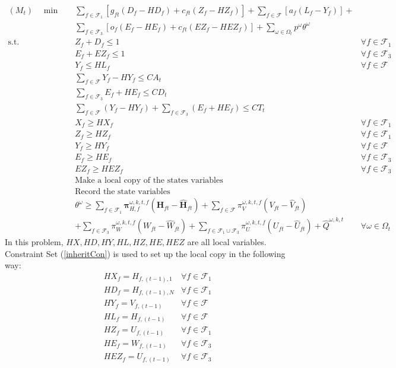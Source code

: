 \documentclass[12pt]{article}
\begin{document}
	\begin{align}
		(M_t)\quad \min \quad & \sum_{f \in \mathcal{F}_1} \left[ g_{ft} (D_f - HD_f) + c_{ft} (Z_f - HZ_f) \right] + \sum_{f \in \mathcal{F}} \left[ a_f (L_f - Y_f)\right] + & \nonumber \\
		& \sum_{f \in \mathcal{F}_3} \left[ o_f(E_f - HE_f) + c_{ft}(EZ_f - HEZ_f)\right] + \sum_{\omega \in \Omega_t} p^\omega \theta^\omega &\\
		\text{s.t.} \quad & Z_f + D_f \leq 1 & \forall f \in \mathcal{F}_1\\
		& E_f + EZ_f \leq 1 & \forall f \in \mathcal{F}_3\\
		& Y_f \leq HL_f & \forall f \in \mathcal{F}\\
		& \sum_{f \in \mathcal{F}} Y_f - HY_f \leq CA_t &\\
		& \sum_{f \in \mathcal{F}_3} E_f + HE_f \leq CD_t &\\
		& \sum_{f \in \mathcal{F}} (Y_f - HY_f) + \sum_{f \in \mathcal{F}_3} (E_f + HE_f) \leq CT_t &\\
		& X_f \geq HX_f & \forall f \in \mathcal{F}_1\\
		& Z_f \geq HZ_f & \forall f \in \mathcal{F}_1\\
		& Y_f \geq HY_f & \forall f \in \mathcal{F}\\
		& E_f \geq HE_f & \forall f \in \mathcal{F}_3\\
		& EZ_f \geq HEZ_f & \forall f \in \mathcal{F}_3\\
		& \text{Make a local copy of the states variables}& \label{inheritCon}\\
		& \text{Record the state variables}& \label{passDown}\\
		& \theta^\omega \geq \sum_{f \in \mathcal{F}_1} \mathbf{\pi}_{H,f}^{\omega,k,t,f} (\mathbf{H}_{ft} - \hat{\mathbf{H}}_{ft}) + \sum_{f \in \mathcal{F}}\pi_{V}^{\omega,k,t,f} (V_{ft} - \hat{V}_{ft}) & \nonumber\\
		& + \sum_{f \in \mathcal{F}_3} \pi_{W}^{\omega,k,t,f} (W_{ft} - \hat{W}_{ft}) + \sum_{f \in \mathcal{F}_1 \cup \mathcal{F}_3} \pi_{U}^{\omega,k,t,f} (U_{ft} - \hat{U}_{ft}) + \hat{Q}^{\omega,k,t} & \forall \omega \in \Omega_t
	\end{align}
	In this problem, \(HX,HD,HY,HL,HZ,HE,HEZ\) are all local variables. Constraint Set (\ref{inheritCon}) is used to set up the local copy in the following way:
	\begin{align*}
		& HX_f = H_{f,(t-1),1}& \forall f \in \mathcal{F}_1\\
		& HD_f = H_{f,(t-1),N}& \forall f \in \mathcal{F}_1\\
		& HY_f = V_{f,(t-1)}& \forall f \in \mathcal{F}\\
		& HL_f = H_{f,(t-1)}& \forall f \in \mathcal{F}\\
		& HZ_f = U_{f,(t-1)}& \forall f \in \mathcal{F}_1\\
		& HE_f = W_{f,(t-1)}& \forall f \in \mathcal{F}_3\\
		& HEZ_f = U_{f,(t-1)}& \forall f \in \mathcal{F}_3\\
	\end{align*}
\end{document}
